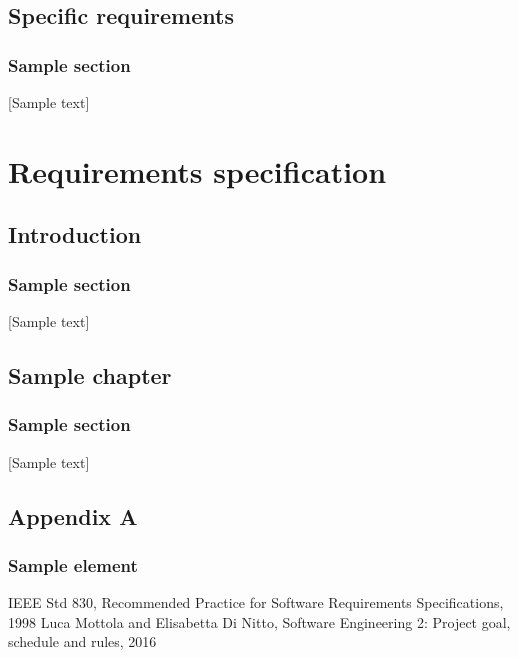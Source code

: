 \documentclass[openright]{report}
\begin{document}
    \chapter{Specific requirements}
    \section{Sample section}
		[Sample text]

	\part{Requirements specification}
	\chapter{Introduction}
    \section{Sample section}
		[Sample text]
	\chapter{Sample chapter}
	\section{Sample section}
		[Sample text]


    \newpage
    \appendix
    \chapter{Appendix A}
    \section{Sample element}

	\newpage
	\begin{thebibliography}{10}
			IEEE Std 830, Recommended Practice for Software Requirements Specifications, 1998
			Luca Mottola and Elisabetta Di Nitto, Software Engineering 2: Project goal, schedule and rules, 2016
	\end{thebibliography}
\end{document}

